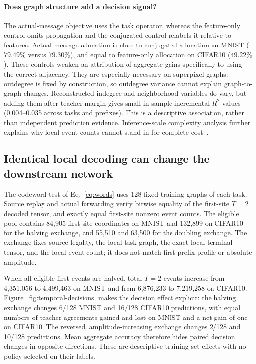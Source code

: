\documentclass[10pt,twocolumn,letterpaper]{article}
\begin{document}
\paragraph{Does graph structure add a decision signal?}
The actual-message objective uses the task operator, whereas the feature-only control omits propagation and the conjugated control relabels it relative to features. Actual-message allocation is close to conjugated allocation on MNIST ($79.49\%$ versus $79.30\%$), and equal to feature-only allocation on CIFAR10 ($49.22\%$). These controls weaken an attribution of aggregate gains specifically to using the correct adjacency. They are especially necessary on superpixel graphs: outdegree is fixed by construction, so outdegree variance cannot explain graph-to-graph changes. Reconstructed indegree and neighborhood variables do vary, but adding them after teacher margin gives small in-sample incremental $R^2$ values (0.004--0.035 across tasks and prefixes). This is a descriptive association, rather than independent prediction evidence. Inference-scale complexity analysis further explains why local event counts cannot stand in for complete cost~\cite{bu2025complexity}.

\subsection{Identical local decoding can change the downstream network}
The codeword test of Eq.~\eqref{eq:words} uses 128 fixed training graphs of each task. Source replay and actual forwarding verify bitwise equality of the first-site $T=2$ decoded tensor, and exactly equal first-site nonzero event counts. The eligible pool contains 84,905 first-site coordinates on MNIST and 132,899 on CIFAR10 for the halving exchange, and 55,510 and 63,500 for the doubling exchange. The exchange fixes source legality, the local task graph, the exact local terminal tensor, and the local event count; it does not match first-prefix profile or absolute amplitude.

When all eligible first events are halved, total $T=2$ events increase from 4,351,056 to 4,499,463 on MNIST and from 6,876,233 to 7,219,258 on CIFAR10. Figure~\ref{fig:temporal-decisions} makes the decision effect explicit: the halving exchange changes 6/128 MNIST and 16/128 CIFAR10 predictions, with equal numbers of teacher agreements gained and lost on MNIST and a net gain of one on CIFAR10. The reversed, amplitude-increasing exchange changes 2/128 and 10/128 predictions. Mean aggregate accuracy therefore hides paired decision changes in opposite directions. These are descriptive training-set effects with no policy selected on their labels.
\end{document}
